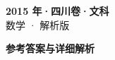 \documentclass[zihao=-4, a4paper]{ctexart}
\begin{document}
\begin{center}
  {\Large\bfseries 2015 年·四川卷·文科}\\[4pt]
  {\large 数学 · 解析版}
\end{center}
\medskip
{}

\clearpage
{}
\begin{center}{\Large\bfseries 参考答案与详细解析}\end{center}
\medskip

\end{document}
